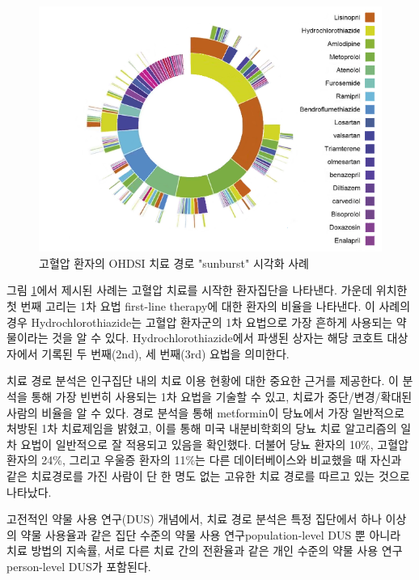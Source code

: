 \documentclass[10.5pt]{book}
\theoremstyle{definition}
\theoremstyle{definition}
\theoremstyle{definition}
\theoremstyle{remark}
\begin{document}
\begin{figure}

{\centering \includegraphics[width=1\linewidth]{images/Characterization/pnasTreatmentPathwaysSunburst} 

}

\caption{고혈압 환자의 OHDSI 치료 경로 "sunburst" 시각화 사례}\label{fig:treatmentPathwaysSunburstDataViz}
\end{figure}

그림 \ref{fig:treatmentPathwaysSunburstDataViz}에서 제시된 사례는 고혈압
치료를 시작한 환자집단을 나타낸다. 가운데 위치한 첫 번째 고리는 1차 요법
first-line therapy에 대한 환자의 비율을 나타낸다. 이 사례의 경우
Hydrochlorothiazide는 고혈압 환자군의 1차 요법으로 가장 흔하게 사용되는
약물이라는 것을 알 수 있다. Hydrochlorothiazide에서 파생된 상자는 해당
코호트 대상자에서 기록된 두 번째(2nd), 세 번째(3rd) 요법을 의미한다.

치료 경로 분석은 인구집단 내의 치료 이용 현황에 대한 중요한 근거를
제공한다. 이 분석을 통해 가장 빈번히 사용되는 1차 요법을 기술할 수 있고,
치료가 중단/변경/확대된 사람의 비율을 알 수 있다. 경로 분석을 통해
metformin이 당뇨에서 가장 일반적으로 처방된 1차 치료제임을 밝혔고, 이를
통해 미국 내분비학회의 당뇨 치료 알고리즘의 일차 요법이 일반적으로 잘
적용되고 있음을 확인했다. 더불어 당뇨 환자의 10\%, 고혈압 환자의 24\%,
그리고 우울증 환자의 11\%는 다른 데이터베이스와 비교했을 때 자신과 같은
치료경로를 가진 사람이 단 한 명도 없는 고유한 치료 경로를 따르고 있는
것으로 나타났다.

고전적인 약물 사용 연구(DUS) 개념에서, 치료 경로 분석은 특정 집단에서
하나 이상의 약물 사용율과 같은 집단 수준의 약물 사용
연구population-level DUS 뿐 아니라 치료 방법의 지속률, 서로 다른 치료
간의 전환율과 같은 개인 수준의 약물 사용 연구person-level DUS가
포함된다.
\end{document}
